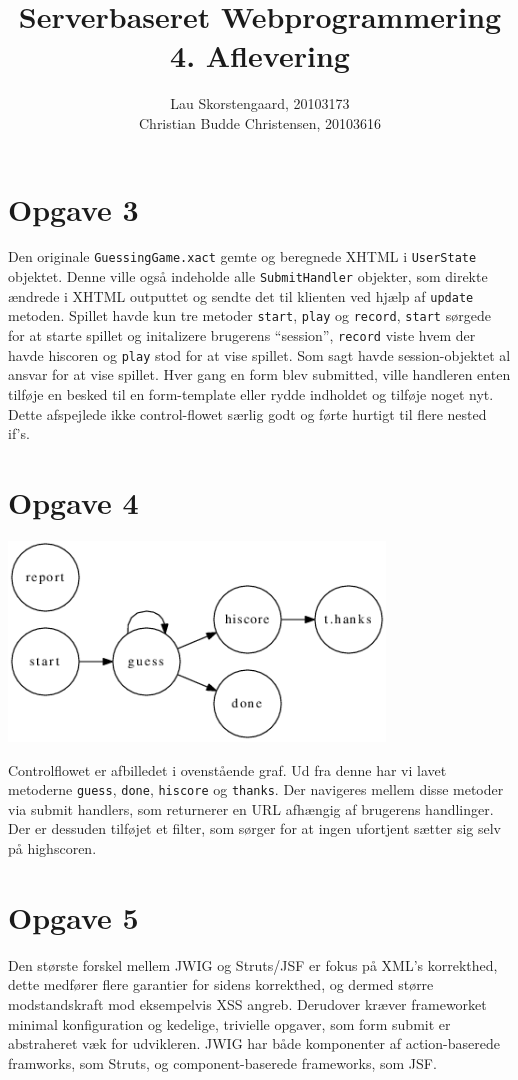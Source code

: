 \documentclass[a4paper,10pt]{article}
\author{Lau Skorstengaard, 20103173 \\Christian Budde Christensen, 20103616}
\title{Serverbaseret Webprogrammering\\4. Aflevering}
\begin{document}
\maketitle
\section*{Opgave 3}
Den originale \texttt{GuessingGame.xact} gemte og beregnede XHTML i \texttt{UserState} objektet. Denne ville også indeholde alle \texttt{SubmitHandler} objekter, som direkte ændrede i XHTML outputtet og sendte det til klienten ved hjælp af \texttt{update} metoden. Spillet havde kun tre metoder \texttt{start}, \texttt{play} og \texttt{record}, \texttt{start} sørgede for at starte spillet og initalizere brugerens ``session'', \texttt{record} viste hvem der havde hiscoren og \texttt{play} stod for at vise spillet. Som sagt havde session-objektet al ansvar for at vise spillet. Hver gang en form blev submitted, ville handleren enten tilføje en besked til en form-template eller rydde indholdet og tilføje noget nyt. Dette afspejlede ikke control-flowet særlig godt og førte hurtigt til flere nested if's. 
\section*{Opgave 4}
\begin{center}
\includegraphics[width=10cm]{graphs/g0.png}
\end{center}
Controlflowet er afbilledet i ovenstående graf. Ud fra denne har vi lavet metoderne \texttt{guess},  \texttt{done},  \texttt{hiscore} og  \texttt{thanks}. Der navigeres mellem disse metoder via submit handlers, som returnerer en URL afhængig af brugerens handlinger. Der er dessuden tilføjet et filter, som sørger for at ingen ufortjent sætter sig selv på highscoren.  
\section*{Opgave 5}
Den største forskel mellem JWIG og Struts/JSF er fokus på XML's korrekthed, dette medfører flere garantier for sidens korrekthed, og dermed større modstandskraft mod eksempelvis XSS angreb. Derudover kræver frameworket minimal konfiguration og kedelige, trivielle opgaver, som form submit er abstraheret væk for udvikleren. JWIG har både komponenter af action-baserede framworks, som Struts, og component-baserede frameworks, som JSF.  
\end{document}
